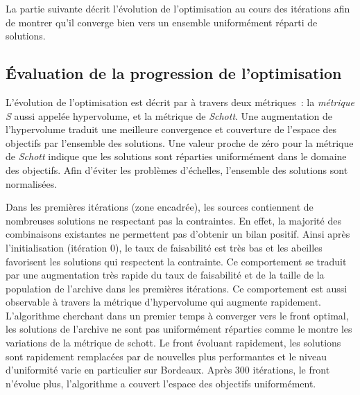 La partie suivante décrit l’évolution de l’optimisation au cours des itérations
afin de montrer qu’il converge bien vers un ensemble uniformément réparti de solutions.



\subsection{Évaluation de la progression de l’optimisation} %
\label{sub:evaluation_de_la_progression_de_l_optimisation}
L’évolution de l’optimisation est décrit par  à
travers deux métriques~: la \textit{métrique S} aussi appelée hypervolume, et la métrique
de \textit{Schott}. Une augmentation de l’hypervolume traduit une meilleure convergence et
couverture de l’espace des objectifs par l’ensemble des solutions. Une valeur proche de
zéro pour la métrique de \textit{Schott} indique que les solutions sont réparties
uniformément dans le domaine des objectifs. Afin d’éviter les problèmes d’échelles,
l’ensemble des solutions sont normalisées.

Dans les premières itérations (zone encadrée), les sources contiennent de nombreuses
solutions ne respectant pas la contraintes. En effet, la majorité des combinaisons
existantes ne permettent pas d’obtenir un bilan positif. Ainsi après l’initialisation
(itération $0$), le taux de faisabilité est très bas et les abeilles favorisent
les solutions qui respectent la contrainte. Ce comportement se traduit par une
augmentation très rapide du taux de faisabilité et de la taille de la population de
l’archive dans les premières itérations. Ce comportement est aussi observable à travers la
métrique d’hypervolume qui augmente rapidement. L’algorithme cherchant dans un premier
temps à converger vers le front optimal, les solutions de l’archive ne sont pas
uniformément réparties comme le montre les variations de la métrique de schott. Le front
évoluant rapidement, les solutions sont rapidement remplacées par de nouvelles plus
performantes et le niveau d’uniformité varie en particulier sur Bordeaux. Après $300$ itérations, le front n’évolue plus,
l’algorithme a couvert l’espace des objectifs uniformément.

